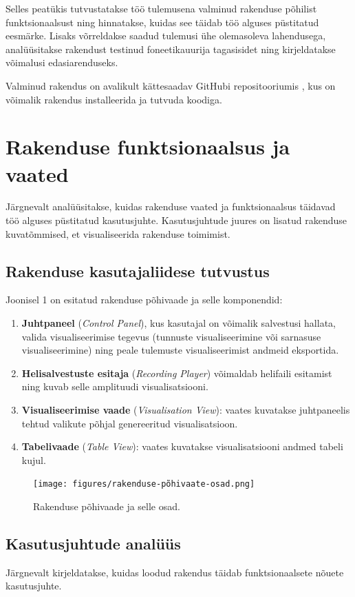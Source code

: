 Selles peatükis tutvustatakse töö tulemusena valminud rakenduse põhilist funktsionaalsust ning hinnatakse, kuidas see täidab töö alguses püstitatud eesmärke. Lisaks võrreldakse saadud tulemusi ühe olemasoleva lahendusega, analüüsitakse rakendust testinud foneetikauurija tagasisidet ning kirjeldatakse võimalusi edasiarenduseks.

Valminud rakendus on avalikult kättesaadav GitHubi repositooriumis \cite{hrauds_repo}, kus on võimalik rakendus installeerida ja tutvuda koodiga.

\section{Rakenduse funktsionaalsus ja vaated}
Järgnevalt analüüsitakse, kuidas rakenduse vaated ja funktsionaalsus täidavad töö alguses püstitatud kasutusjuhte. Kasutusjuhtude juures on lisatud rakenduse kuvatõmmised, et visualiseerida rakenduse toimimist.

\subsection{Rakenduse kasutajaliidese tutvustus}
Joonisel 1 on esitatud rakenduse põhivaade ja selle komponendid:
\begin{enumerate}
    \item \textbf{Juhtpaneel} (\textit{Control Panel}), kus kasutajal on võimalik salvestusi hallata, valida visualiseerimise tegevus (tunnuste visualiseerimine või sarnasuse visualiseerimine) ning peale tulemuste visualiseerimist andmeid eksportida.
    \item \textbf{Helisalvestuste esitaja} (\textit{Recording Player}) võimaldab helifaili esitamist ning kuvab selle amplituudi visualisatsiooni.
    \item \textbf{Visualiseerimise vaade} (\textit{Visualisation View}): vaates kuvatakse juhtpaneelis tehtud valikute põhjal genereeritud visualisatsioon.
    \item \textbf{Tabelivaade} (\textit{Table View}): vaates kuvatakse visualisatsiooni andmed tabeli kujul.
\end{enumerate}

\begin{figure}[H]
    \centering
    \texttt{[image: figures/rakenduse-põhivaate-osad.png]}
    \caption{Rakenduse põhivaade ja selle osad.}
    \label{fig:rakenduse-põhivaate-osad}
\end{figure}

\subsection{Kasutusjuhtude analüüs}
Järgnevalt kirjeldatakse, kuidas loodud rakendus täidab funktsionaalsete nõuete kasutusjuhte.

